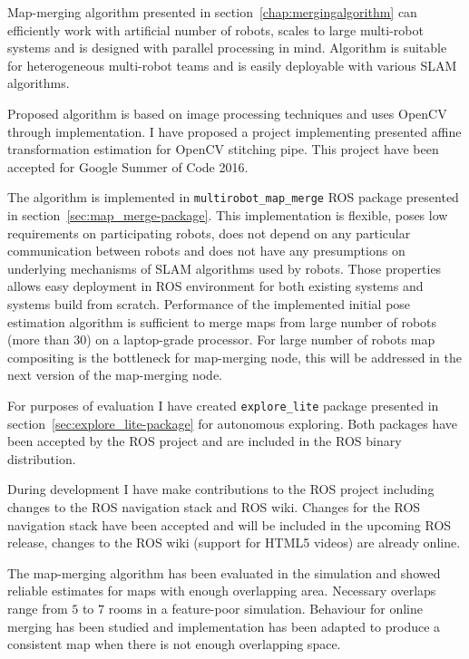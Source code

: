 
Map-merging algorithm presented in section~\ref{chap:mergingalgorithm} can efficiently work with artificial number of robots, scales to large multi-robot systems and is designed with parallel processing in mind. Algorithm is suitable for heterogeneous multi-robot teams and is easily deployable with various \gls{SLAM} algorithms.

Proposed algorithm is based on image processing techniques and uses \gls{OpenCV} through implementation. I have proposed a project implementing presented affine transformation estimation for \gls{OpenCV} stitching pipe. This project have been accepted for Google Summer of Code 2016.

The algorithm is implemented in \texttt{multirobot\_map\_merge} \gls{ROS} package presented in section~\ref{sec:map_merge-package}. This implementation is flexible, poses low requirements on participating robots, does not depend on any particular communication between robots and does not have any presumptions on underlying mechanisms of \gls{SLAM} algorithms used by robots. Those properties allows easy deployment in \gls{ROS} environment for both existing systems and systems build from scratch. Performance of the implemented initial pose estimation algorithm is sufficient to merge maps from large number of robots (more than $30$) on a laptop-grade processor. For large number of robots map compositing is the bottleneck for map-merging node, this will be addressed in the next version of the map-merging node.

For purposes of evaluation I have created \texttt{explore\_lite} package presented in section~\ref{sec:explore_lite-package} for autonomous exploring. Both packages have been accepted by the \gls{ROS} project and are included in the \gls{ROS} binary distribution.

During development I have make contributions to the \gls{ROS} project including changes to the \gls{ROS} navigation stack and \gls{ROS} wiki. Changes for the \gls{ROS} navigation stack have been accepted and will be included in the upcoming \gls{ROS} release, changes to the \gls{ROS} wiki (support for HTML5 videos) are already online.

The map-merging algorithm has been evaluated in the simulation and showed reliable estimates for maps with enough overlapping area. Necessary overlaps range from $5$ to $7$ rooms in a feature-poor simulation. Behaviour for online merging has been studied and implementation has been adapted to produce a consistent map when there is not enough overlapping space.

